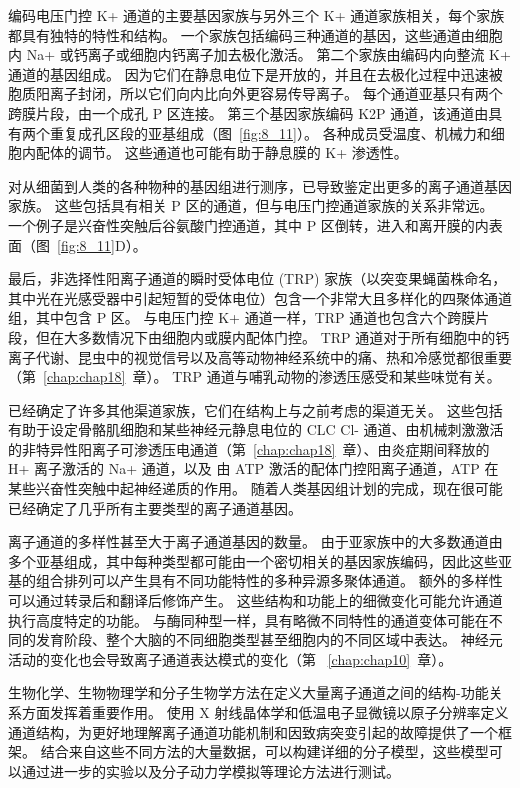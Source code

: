 编码电压门控 K+ 通道的主要基因家族与另外三个 K+ 通道家族相关，每个家族都具有独特的特性和结构。
一个家族包括编码三种通道的基因，这些通道由细胞内 Na+ 或钙离子或细胞内钙离子加去极化激活。
第二个家族由编码内向整流 K+ 通道的基因组成。
因为它们在静息电位下是开放的，并且在去极化过程中迅速被胞质阳离子封闭，所以它们向内比向外更容易传导离子。
每个通道亚基只有两个跨膜片段，由一个成孔 P 区连接。
第三个基因家族编码 K2P 通道，该通道由具有两个重复成孔区段的亚基组成（图~\ref{fig:8_11}）。
各种成员受温度、机械力和细胞内配体的调节。
这些通道也可能有助于静息膜的 K+ 渗透性。


对从细菌到人类的各种物种的基因组进行测序，已导致鉴定出更多的离子通道基因家族。
这些包括具有相关 P 区的通道，但与电压门控通道家族的关系非常远。
一个例子是兴奋性突触后谷氨酸门控通道，其中 P 区倒转，进入和离开膜的内表面（图~\ref{fig:8_11}D）。


最后，非选择性阳离子通道的瞬时受体电位 (TRP) 家族（以突变果蝇菌株命名，其中光在光感受器中引起短暂的受体电位）包含一个非常大且多样化的四聚体通道组，其中包含 P 区。
与电压门控 K+ 通道一样，TRP 通道也包含六个跨膜片段，但在大多数情况下由细胞内或膜内配体门控。
TRP 通道对于所有细胞中的钙离子代谢、昆虫中的视觉信号以及高等动物神经系统中的痛、热和冷感觉都很重要（第~\ref{chap:chap18}~章）。
TRP 通道与哺乳动物的渗透压感受和某些味觉有关。


已经确定了许多其他渠道家族，它们在结构上与之前考虑的渠道无关。
这些包括有助于设定骨骼肌细胞和某些神经元静息电位的 CLC Cl- 通道、由机械刺激激活的非特异性阳离子可渗透压电通道（第~\ref{chap:chap18}~章）、由炎症期间释放的 H+ 离子激活的 Na+ 通道，以及 由 ATP 激活的配体门控阳离子通道，ATP 在某些兴奋性突触中起神经递质的作用。
随着人类基因组计划的完成，现在很可能已经确定了几乎所有主要类型的离子通道基因。


离子通道的多样性甚至大于离子通道基因的数量。
由于亚家族中的大多数通道由多个亚基组成，其中每种类型都可能由一个密切相关的基因家族编码，因此这些亚基的组合排列可以产生具有不同功能特性的多种异源多聚体通道。
额外的多样性可以通过转录后和翻译后修饰产生。
这些结构和功能上的细微变化可能允许通道执行高度特定的功能。
与酶同种型一样，具有略微不同特性的通道变体可能在不同的发育阶段、整个大脑的不同细胞类型甚至细胞内的不同区域中表达。
神经元活动的变化也会导致离子通道表达模式的变化（第 ~\ref{chap:chap10}~章）。


生物化学、生物物理学和分子生物学方法在定义大量离子通道之间的结构-功能关系方面发挥着重要作用。
使用 X 射线晶体学和低温电子显微镜以原子分辨率定义通道结构，为更好地理解离子通道功能机制和因致病突变引起的故障提供了一个框架。
结合来自这些不同方法的大量数据，可以构建详细的分子模型，这些模型可以通过进一步的实验以及分子动力学模拟等理论方法进行测试。





